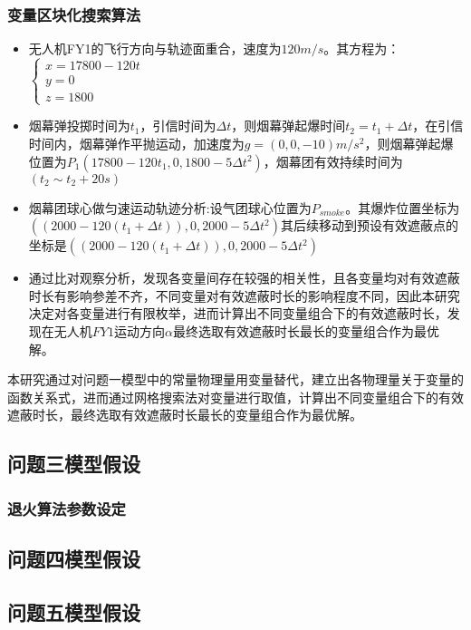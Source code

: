 \documentclass{article}
\begin{document}
\subsubsection{变量区块化搜索算法}
\begin{itemize}
    \item 无人机FY1的飞行方向与轨迹面重合，速度为$120m/s$。其方程为：$\begin{cases}
        x = 17800 - 120t \\
        y = 0 \\
        z = 1800
    \end{cases}$
    \item 烟幕弹投掷时间为$t_1$，引信时间为$\Delta t$，则烟幕弹起爆时间$t_2 = t_1 + \Delta t$，在引信时间内，烟幕弹作平抛运动，加速度为$g = (0,0,-10)$$m/s^2$，则烟幕弹起爆位置为$P_1(17800 - 120t_1,0,1800 - 5\Delta t^2)$，烟幕团有效持续时间为$(t_2 \sim t_2 + 20s)$
    \item 烟幕团球心做匀速运动轨迹分析:设气团球心位置为$P_{smoke}$。其爆炸位置坐标为$((2000-120(t_1 + \Delta t)),0,2000-5 \Delta t^2)$其后续移动到预设有效遮蔽点的坐标是$((2000-120(t_1 + \Delta t)),0,2000-5 \Delta t^2)$
    \item 通过比对观察分析，发现各变量间存在较强的相关性，且各变量均对有效遮蔽时长有影响参差不齐，不同变量对有效遮蔽时长的影响程度不同，因此本研究决定对各变量进行有限枚举，进而计算出不同变量组合下的有效遮蔽时长，发现在$无人机FY1运动方向\alpha$最终选取有效遮蔽时长最长的变量组合作为最优解。
\end{itemize}
本研究通过对问题一模型中的常量物理量用变量替代，建立出各物理量关于变量的函数关系式，进而通过网格搜索法对变量进行取值，计算出不同变量组合下的有效遮蔽时长，最终选取有效遮蔽时长最长的变量组合作为最优解。
\subsection{问题三模型假设}

\subsubsection{退火算法参数设定}

\subsection{问题四模型假设}

\subsection{问题五模型假设}
\end{document}

